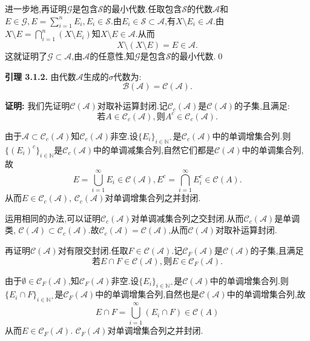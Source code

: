 进一步地,再证明$\mathcal{G}$是包含$\mathcal{S}$的最小代数.任取包含$\mathcal{S}$的代数$\mathcal{A}$和$E\in \mathcal{G},E=\sum\limits_{i=1}^{n}E_{i},E_{i}\in{\mathcal S}$.由$E_i\in \mathcal{S}\subset \mathcal{A}$,有$X\setminus E_i\in \mathcal{A}$.由$X\setminus E=\bigcap\limits_{i=1}^n (X\setminus E_i)$知$X\setminus E\in \mathcal{A}$.从而
$$X\setminus (X\setminus E)=E\in\mathcal{A}.$$
这就证明了$\mathcal{G}\subset\mathcal{A}$,由$\mathcal{A}$的任意性,知$\mathcal{G}$是包含$\mathcal{S}$的最小代数.\qed
\par
\textbf{引理 3.1.2.  }\textsuperscript{\cite{Ergodic_Sun,Ergodic_theory}}
由代数$\mathcal{A}$生成的$\sigma$代数为:
$$\mathcal{B}(\mathcal{A})=\mathcal{C}(\mathcal{A}).$$
\par
\textbf{证明:  }
我们先证明$\mathcal{C}(\mathcal{A})$对取补运算封闭.记$\mathcal{C}_c(\mathcal{A})$是$\mathcal{C}(\mathcal{A})$的子集,且满足:
$$\text{若}A\in\mathcal{C}_c(\mathcal{A}),\text{则}A^{c}\in\mathcal{C}_c(\mathcal{A}).$$\par
由于$\mathcal{A}\subset\mathcal{C}_c(\mathcal{A})$知$\mathcal{C}_c(\mathcal{A})$非空.设$\{E_i\}_{i\in\mathbb{N}^+}$是$\mathcal{C}_c(\mathcal{A})$中的单调增集合列.则$\{(E_i)^{c}\}_{i\in\mathbb{N}}$是$\mathcal{C}_c(\mathcal{A})$中的单调减集合列,自然它们都是$\mathcal{C}(\mathcal{A})$中的单调集合列,故
$$E=\bigcup_{i=1}^{\infty}E_{i}\in{\mathcal C}\left({\mathcal A}\right),E^c=\bigcap_{i=1}^{\infty}E_{i}^{c}\in{\mathcal C}\left({A}\right).$$
从而$E\in\mathcal{C}_c(\mathcal{A})$, $\mathcal{C}_c(\mathcal{A})$对单调增集合列之并封闭.\par
运用相同的办法,可以证明$\mathcal{C}_c(\mathcal{A})$对单调减集合列之交封闭.从而$\mathcal{C}_c(\mathcal{A})$是单调类, $\mathcal{C}(\mathcal{A})\subset\mathcal{C}_c(\mathcal{A})$.故$\mathcal{C}_c(\mathcal{A})=\mathcal{C}(\mathcal{A})$,从而$\mathcal{C}(\mathcal{A})$对取补运算封闭.\par
再证明$\mathcal{C}(\mathcal{A})$对有限交封闭.任取$F\in\mathcal{C}(\mathcal{A})$.记$\mathcal{C}_F(\mathcal{A})$是$\mathcal{C}(\mathcal{A})$的子集,且满足
$$\text{若}E\cap F\in\mathcal{C}(\mathcal{A}),\text{则}E\in\mathcal{C}_F(\mathcal{A}).$$\par
由于$\emptyset\in\mathcal{C}_F(\mathcal{A})$,知$\mathcal{C}_F(\mathcal{A})$非空.设$\{E_i\}_{i\in\mathbb{N}^+}$是$\mathcal{C}(\mathcal{A})$中的单调增集合列.则$\{E_i\cap F\}_{i\in\mathbb{N}^+}$是$\mathcal{C}_F(\mathcal{A})$中的单调增集合列,自然也是$\mathcal{C}(\mathcal{A})$中的单调增集合列,故
$$E\cap F=\bigcup_{i=1}^{\infty}\left(E_i\cap F\right)\in\mathcal{C}\left(A\right)$$
从而$E\in\mathcal{C}_F(\mathcal{A})$. $\mathcal{C}_F(\mathcal{A})$对单调增集合列之并封闭.\par
